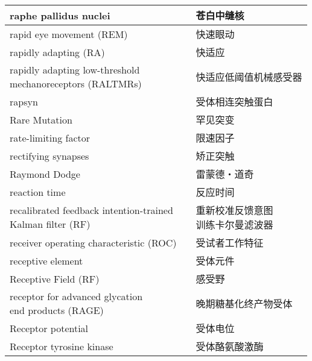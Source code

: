 \begin{longtable}{lll}
	\midrule
	raphe pallidus nuclei   && 苍白中缝核  \\
	
	\midrule
	rapid eye movement (REM)   && 快速眼动  \\
	
	\midrule
	rapidly adapting (RA)   && 快适应  \\
	
	\midrule
	\makecell[l]{rapidly adapting low-threshold\\ mechanoreceptors (RALTMRs)}  && 快适应低阈值机械感受器  \\
	
	\midrule
	rapsyn  && 受体相连突触蛋白  \\
	
	\midrule
	Rare Mutation  && 罕见突变  \\
	
	\midrule
	rate-limiting factor  && 限速因子  \\
	
	\midrule
	rectifying synapses  && 矫正突触  \\
	
	\midrule
	Raymond Dodge  && 雷蒙德・道奇  \\
	
	\midrule
	reaction time  && 反应时间  \\
	
	\midrule
	\makecell[l]{recalibrated feedback intention-trained\\ Kalman filter (RF)}   && \makecell[l]{重新校准反馈意图\\训练卡尔曼滤波器}  \\
	
	\midrule
	receiver operating characteristic (ROC)   && 受试者工作特征  \\
	
	\midrule
	receptive element   && 受体元件  \\
	
	\midrule
	Receptive Field (RF)   && 感受野  \\
	
	\midrule
	\makecell[l]{receptor for advanced glycation \\end products (RAGE)}   && 晚期糖基化终产物受体  \\
	
	\midrule
	Receptor potential   && 受体电位  \\
	
	\midrule
	Receptor tyrosine kinase   && 受体酪氨酸激酶  \\
	

\end{longtable}
